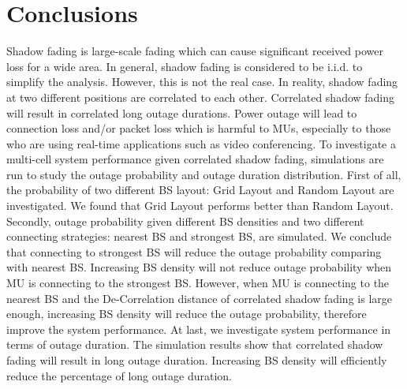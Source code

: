 \section{Conclusions}
\label{ch4:Conclusion}
Shadow fading is large-scale fading which can cause significant received power loss for a wide area. In general, shadow fading is considered to be i.i.d. to simplify the analysis. However, this is not the real case. In reality, shadow fading at two different positions are correlated to each other. Correlated shadow fading will result in correlated long outage durations. Power outage will lead to connection loss and/or packet loss which is harmful to MUs, especially to those who are using real-time applications such as video conferencing. To investigate a multi-cell system performance given correlated shadow fading, simulations are run to study the outage probability and outage duration distribution. First of all, the probability of two different BS layout: Grid Layout and Random Layout are investigated. We found that Grid Layout performs better than Random Layout. Secondly, outage probability given different BS densities and two different connecting strategies: nearest BS and strongest BS, are simulated. We conclude that connecting to strongest BS will reduce the outage probability comparing with nearest BS. Increasing BS density will not reduce outage probability when MU is connecting to the strongest BS. However, when MU is connecting to the nearest BS and the De-Correlation distance of correlated shadow fading is large enough, increasing BS density will reduce the outage probability, therefore improve the system performance. At last, we investigate system performance in terms of outage duration. The simulation results show that correlated shadow fading will result in long outage duration. Increasing BS density will efficiently reduce the percentage of long outage duration.
 

